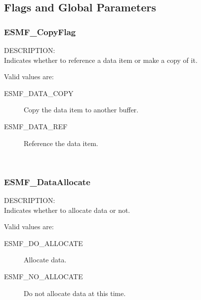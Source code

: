 
\subsection{Flags and Global Parameters}

\subsubsection{ESMF\_CopyFlag}

{\sf DESCRIPTION:\\}
Indicates whether to reference a data item or make a copy of it.

Valid values are:
\begin{description}

\item [ESMF\_DATA\_COPY] 
      Copy the data item to another buffer.

\item [ESMF\_DATA\_REF] 
      Reference the data item.
\end{description}


\mbox{}\hrulefill\

\subsubsection{ESMF\_DataAllocate}

{\sf DESCRIPTION:\\}  
Indicates whether to allocate data or not.

Valid values are:
\begin{description}

\item [ESMF\_DO\_ALLOCATE] 
      Allocate data. 

\item [ESMF\_NO\_ALLOCATE]
      Do not allocate data at this time. 
\end{description}


\mbox{}\hrulefill\
